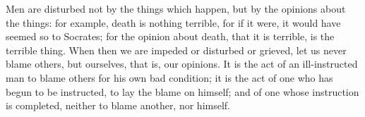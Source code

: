 Men are disturbed not by the things which happen, but by the opinions about the
things: for example, death  is nothing terrible, for if it  were, it would have
seemed so to Socrates; for the opinion about death, that it is terrible, is the
terrible thing. When then we are impeded  or disturbed or grieved, let us never
blame  others, but  ourselves, that  is,  our opinions.  It  is the  act of  an
ill-instructed man to blame others for his  own bad condition; it is the act of
one who  has begun to be  instructed, to lay the  blame on himself; and  of one
whose instruction is completed, neither to blame another, nor himself.
